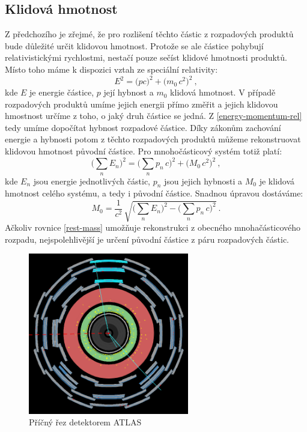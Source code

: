 \documentclass[10pt,a4paper]{article}
\newcommand{\°}{\degree}
\begin{document}
\subsection{Klidová hmotnost}
Z předchozího je zřejmé, že pro rozlišení těchto částic z rozpadových produktů bude důležité určit klidovou hmotnost. Protože se ale částice pohybují relativistickými rychlostmi, nestačí pouze sečíst klidové hmotnosti produktů. Místo toho máme k dispozici vztah ze speciální relativity:
\begin{equation}
    E^2 = \big( pc \big)^2 + \big( m_0 \, c^2 \big)^2 \: ,
    \label{energy-momentum-rel}
\end{equation}
kde $E$ je energie částice, $p$ její hybnost a $m_0$ klidová hmotnost. V případě rozpadových produktů umíme jejich energii přímo změřit a jejich klidovou hmostnost určíme z toho, o jaký druh částice se jedná. Z \eqref{energy-momentum-rel} tedy umíme dopočítat hybnost rozpadové částice. Díky zákonům zachování energie a hybnosti potom z těchto rozpadových produktů můžeme rekonstruovat klidovou hmotnost původní částice. Pro mnohočásticový systém totiž platí:
\begin{equation*}
    \Big( \sum_n E_n \Big)^2 = \Big( \sum_n p_n \, c \Big)^2 + \big( M_0 \, c^2 \big)^2 \: ,
\end{equation*}
kde $E_n$ jsou energie jednotlivých částic, $p_n$ jsou jejich hybnosti a $M_0$ je klidová hmotnost celého systému, a tedy i původní částice. Snadnou úpravou dostáváme:
\begin{equation}
    M_0 = \frac{1}{c^2} \, \sqrt{
        \Big( \sum_n E_n \Big)^2 -
        \Big( \sum_n p_n \, c \Big)^2
    }
    \: .
    \label{rest-mass}
\end{equation}
Ačkoliv rovnice \eqref{rest-mass} umožňuje rekonstrukci z obecného mnohačásticového rozpadu, nejspolehlivější je určení původní částice z páru rozpadových částic.

\phantom{.}
\begin{figure}
    \vspace{-2\baselineskip}
    \centering
    \includegraphics[width=7cm]{detektor.png}
    \caption{Příčný řez detektorem ATLAS}
    \label{obr:detektor}
\end{figure}
\end{document}
